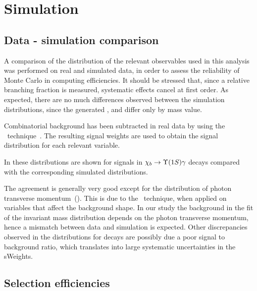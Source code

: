 
\section{Simulation}
\label{sec:mc}

\subsection{Data - simulation comparison}
\label{sec:mc:datavsmc}

A comparison of the distribution of the relevant observables used in this
analysis was performed on real and simulated data, in order to assess the
reliability of Monte Carlo in computing efficiencies. It should be stressed
that, since a relative branching fraction is measured, systematic effects
cancel at first order. As expected, there are no much differences observed between
the simulation distributions, since the generated \chibOneP, \chibTwoP and
\chibThreeP differ only by \chib mass value.

Combinatorial background has been subtracted in real data by using 
the \sPlot\  technique~\cite{Pivk:2004ty}.
The resulting signal weights are used to obtain the signal distribution for each
relevant variable. 


In 
these distributions  are shown for signals in $\chib \to \Y1S \gamma$ decays
compared with the corresponding simulated distributions.




The agreement is generally very good except for the distribution of photon
transverse momentum~(). This is due to the \sPlot\ 
technique, when applied on variables that affect the background shape. In our
study the background in the fit of the invariant mass distribution 
depends on the photon transverse momentum,
hence a mismatch between data and simulation is expected. Other discrepancies
observed in the distributions for \chibThreeP decays are possibly due a poor
signal to background ratio, which translates into large systematic
uncertainties in the sWeights. 


\subsection{Selection efficiencies}
\label{sec:mc:eff}


